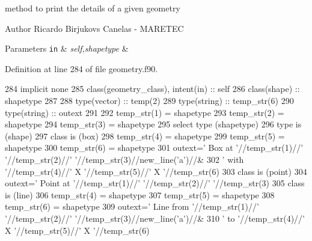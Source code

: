 method to print the details of a given geometry 

\begin{DoxyAuthor}{Author}
Ricardo Birjukovs Canelas -\/ M\+A\+R\+E\+T\+EC 
\end{DoxyAuthor}

\begin{DoxyParams}[1]{Parameters}
\mbox{\tt in}  & {\em self,shapetype} & \\
\hline
\end{DoxyParams}


Definition at line 284 of file geometry.\+f90.


\begin{DoxyCode}
284     \textcolor{keywordtype}{implicit none}
285     \textcolor{keywordtype}{class}(geometry\_class), \textcolor{keywordtype}{intent(in)} :: self
286     \textcolor{keywordtype}{class}(shape) :: shapetype
287 
288     \textcolor{keywordtype}{type}(vector) :: temp(2)
289     \textcolor{keywordtype}{type}(string) :: temp\_str(6)
290     \textcolor{keywordtype}{type}(string) :: outext
291 
292     temp\_str(1) = shapetype%
293     temp\_str(2) = shapetype%
294     temp\_str(3) = shapetype%
295     \textcolor{keywordflow}{select type} (shapetype)
296 \textcolor{keywordflow}{    type is} (shape)
297 \textcolor{keywordflow}{    class is} (box)
298         temp\_str(4) = shapetype%
299         temp\_str(5) = shapetype%
300         temp\_str(6) = shapetype%
301         outext=\textcolor{stringliteral}{'      Box at '}//temp\_str(1)//\textcolor{stringliteral}{' '}//temp\_str(2)//\textcolor{stringliteral}{' '}//temp\_str(3)//new\_line(\textcolor{stringliteral}{'a'})//&
302             \textcolor{stringliteral}{'       with '}//temp\_str(4)//\textcolor{stringliteral}{' X '}//temp\_str(5)//\textcolor{stringliteral}{' X '}//temp\_str(6)
303 \textcolor{keywordflow}{    class is} (point)
304         outext=\textcolor{stringliteral}{'      Point at '}//temp\_str(1)//\textcolor{stringliteral}{' '}//temp\_str(2)//\textcolor{stringliteral}{' '}//temp\_str(3)
305 \textcolor{keywordflow}{    class is} (line)
306         temp\_str(4) = shapetype%
307         temp\_str(5) = shapetype%
308         temp\_str(6) = shapetype%
309         outext=\textcolor{stringliteral}{'      Line from '}//temp\_str(1)//\textcolor{stringliteral}{' '}//temp\_str(2)//\textcolor{stringliteral}{' '}//temp\_str(3)//new\_line(\textcolor{stringliteral}{'a'})//&
310             \textcolor{stringliteral}{'       to '}//temp\_str(4)//\textcolor{stringliteral}{' X '}//temp\_str(5)//\textcolor{stringliteral}{' X '}//temp\_str(6)

\end{DoxyCode}
